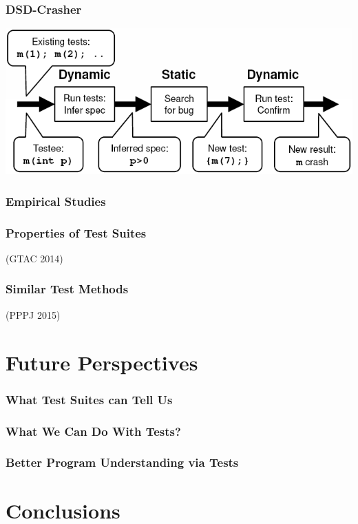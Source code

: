 \documentclass{beamer}
\begin{document}
\begin{frame}
  \frametitle{DSD-Crasher}

\begin{center}
\includegraphics[width=\textwidth]{images/dsd.png}
\end{center}
\end{frame}

\begin{frame}
  \frametitle{Empirical Studies}
\end{frame}

\begin{frame}
  \frametitle{Properties of Test Suites}
  (GTAC 2014)
\end{frame}

\begin{frame}
  \frametitle{Similar Test Methods}
  (PPPJ 2015)
\end{frame}

\section{Future Perspectives}

\begin{frame}
  \frametitle{What Test Suites can Tell Us}
\end{frame}

\begin{frame}
  \frametitle{What We Can Do With Tests?}
\end{frame}

\begin{frame}
  \frametitle{Better Program Understanding via Tests}
\end{frame}

\section{Conclusions}
\end{document}
